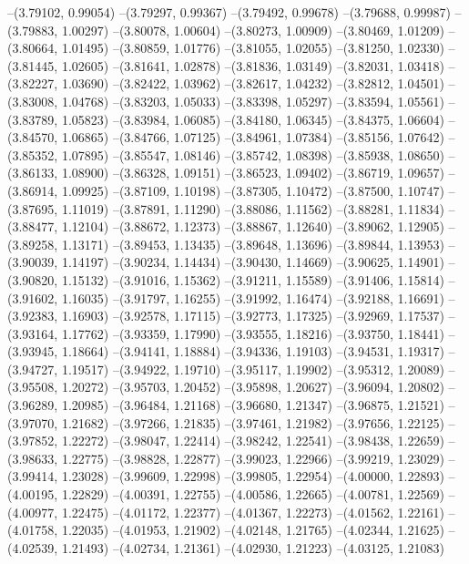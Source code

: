 --(3.79102, 0.99054)
--(3.79297, 0.99367)
--(3.79492, 0.99678)
--(3.79688, 0.99987)
--(3.79883, 1.00297)
--(3.80078, 1.00604)
--(3.80273, 1.00909)
--(3.80469, 1.01209)
--(3.80664, 1.01495)
--(3.80859, 1.01776)
--(3.81055, 1.02055)
--(3.81250, 1.02330)
--(3.81445, 1.02605)
--(3.81641, 1.02878)
--(3.81836, 1.03149)
--(3.82031, 1.03418)
--(3.82227, 1.03690)
--(3.82422, 1.03962)
--(3.82617, 1.04232)
--(3.82812, 1.04501)
--(3.83008, 1.04768)
--(3.83203, 1.05033)
--(3.83398, 1.05297)
--(3.83594, 1.05561)
--(3.83789, 1.05823)
--(3.83984, 1.06085)
--(3.84180, 1.06345)
--(3.84375, 1.06604)
--(3.84570, 1.06865)
--(3.84766, 1.07125)
--(3.84961, 1.07384)
--(3.85156, 1.07642)
--(3.85352, 1.07895)
--(3.85547, 1.08146)
--(3.85742, 1.08398)
--(3.85938, 1.08650)
--(3.86133, 1.08900)
--(3.86328, 1.09151)
--(3.86523, 1.09402)
--(3.86719, 1.09657)
--(3.86914, 1.09925)
--(3.87109, 1.10198)
--(3.87305, 1.10472)
--(3.87500, 1.10747)
--(3.87695, 1.11019)
--(3.87891, 1.11290)
--(3.88086, 1.11562)
--(3.88281, 1.11834)
--(3.88477, 1.12104)
--(3.88672, 1.12373)
--(3.88867, 1.12640)
--(3.89062, 1.12905)
--(3.89258, 1.13171)
--(3.89453, 1.13435)
--(3.89648, 1.13696)
--(3.89844, 1.13953)
--(3.90039, 1.14197)
--(3.90234, 1.14434)
--(3.90430, 1.14669)
--(3.90625, 1.14901)
--(3.90820, 1.15132)
--(3.91016, 1.15362)
--(3.91211, 1.15589)
--(3.91406, 1.15814)
--(3.91602, 1.16035)
--(3.91797, 1.16255)
--(3.91992, 1.16474)
--(3.92188, 1.16691)
--(3.92383, 1.16903)
--(3.92578, 1.17115)
--(3.92773, 1.17325)
--(3.92969, 1.17537)
--(3.93164, 1.17762)
--(3.93359, 1.17990)
--(3.93555, 1.18216)
--(3.93750, 1.18441)
--(3.93945, 1.18664)
--(3.94141, 1.18884)
--(3.94336, 1.19103)
--(3.94531, 1.19317)
--(3.94727, 1.19517)
--(3.94922, 1.19710)
--(3.95117, 1.19902)
--(3.95312, 1.20089)
--(3.95508, 1.20272)
--(3.95703, 1.20452)
--(3.95898, 1.20627)
--(3.96094, 1.20802)
--(3.96289, 1.20985)
--(3.96484, 1.21168)
--(3.96680, 1.21347)
--(3.96875, 1.21521)
--(3.97070, 1.21682)
--(3.97266, 1.21835)
--(3.97461, 1.21982)
--(3.97656, 1.22125)
--(3.97852, 1.22272)
--(3.98047, 1.22414)
--(3.98242, 1.22541)
--(3.98438, 1.22659)
--(3.98633, 1.22775)
--(3.98828, 1.22877)
--(3.99023, 1.22966)
--(3.99219, 1.23029)
--(3.99414, 1.23028)
--(3.99609, 1.22998)
--(3.99805, 1.22954)
--(4.00000, 1.22893)
--(4.00195, 1.22829)
--(4.00391, 1.22755)
--(4.00586, 1.22665)
--(4.00781, 1.22569)
--(4.00977, 1.22475)
--(4.01172, 1.22377)
--(4.01367, 1.22273)
--(4.01562, 1.22161)
--(4.01758, 1.22035)
--(4.01953, 1.21902)
--(4.02148, 1.21765)
--(4.02344, 1.21625)
--(4.02539, 1.21493)
--(4.02734, 1.21361)
--(4.02930, 1.21223)
--(4.03125, 1.21083)
